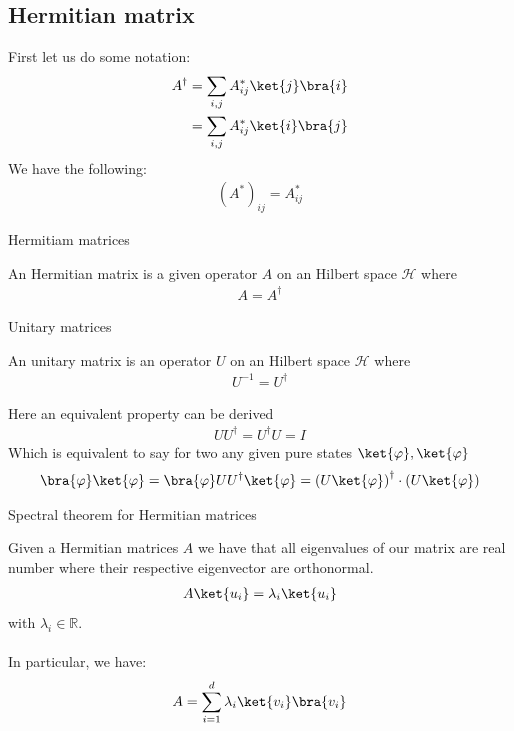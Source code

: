 \subsection{Hermitian matrix}
First let us do some notation:
\begin{align*} 
	A^{\dagger} &=  \sum_{i, j} A_{ij}^{\ast} \ket{j}\bra{i} \\
	&= \sum_{i, j} A_{ij}^{\ast} \ket{i}\bra{j}
\end{align*}
We have the following:
\begin{align*} 
	\left(A^{\ast}\right)_{ij} = A^{\ast}_{ij}
\end{align*}
\begin{parag}{Hermitiam matrices}
    \begin{definition}
    An Hermitian matrix is a given operator $A$ on an Hilbert space $\mathcal{H}$ where 
	\begin{align*} 
		A = A^{\dagger} 
	\end{align*}

    \end{definition}
\end{parag}


\begin{parag}{Unitary matrices}
    
	\begin{definition}
	An unitary matrix is an operator $U$ on an Hilbert space $\mathcal{H}$ where 
	\begin{align*} 
		U^{-1} =  U^{\dagger} 
	\end{align*}
	\end{definition}
	Here an equivalent property can be derived
	\begin{align*} 
		U U^{\dagger} =  U^{\dagger} U = I  
	\end{align*}
	Which is equivalent to say for two any given pure states $\ket{\phi}, \ket{\varphi}$
	\begin{align*} 
		\bra{\phi}\ket{\varphi} = \bra{\phi} U U^{\dagger} \ket{\varphi} =  \left(U \ket{\phi}\right)^{\dagger} \cdot \left(U \ket{\varphi}\right) 
	\end{align*}
\end{parag}


\begin{parag}{Spectral theorem for Hermitian matrices}
    \begin{theoreme}
    Given a Hermitian matrices $A$ we have that all eigenvalues of our matrix are real number where their respective eigenvector are orthonormal.
	\begin{align*} 
		A \ket{u_i} =  \lambda_i  \ket{u_i}
	\end{align*}
	with $\lambda_i \in \mathbb{R}$.\\
	$ $\\
	In particular, we have:
	\begin{align*} 
		A = \sum_{i= 1}^{d} \lambda_i \ket{v_i}\bra{v_i} 
	\end{align*}

    \end{theoreme}
\end{parag}






